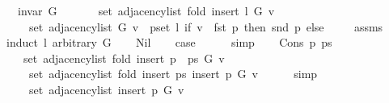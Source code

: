 \begin{isabellebody}
\ \ \ {\isachardoublequoteopen}invar\ G{\isachardoublequoteclose}\isanewline
\ \ \isanewline
\ \ \ \ {\isachardoublequoteopen}set\ {\isacharparenleft}{\kern0pt}adjacency{\isacharunderscore}{\kern0pt}list\ {\isacharparenleft}{\kern0pt}fold\ insert\ l\ G{\isacharparenright}{\kern0pt}\ v{\isacharparenright}{\kern0pt}\ {\isacharequal}{\kern0pt}\isanewline
\ \ \ \ \ set\ {\isacharparenleft}{\kern0pt}adjacency{\isacharunderscore}{\kern0pt}list\ G\ v{\isacharparenright}{\kern0pt}\ {\isasymunion}\ {\isacharparenleft}{\kern0pt}{\isasymUnion}p{\isasymin}set\ l{\isachardot}{\kern0pt}\ if\ v\ {\isacharequal}{\kern0pt}\ fst\ p\ then\ {\isacharbraceleft}{\kern0pt}snd\ p{\isacharbraceright}{\kern0pt}\ else\ {\isacharbraceleft}{\kern0pt}{\isacharbraceright}{\kern0pt}{\isacharparenright}{\kern0pt}{\isachardoublequoteclose}\isanewline
%
\isadelimproof
\ \ %
\endisadelimproof
%
\isatagproof
{}\isamarkupfalse%
\ assms\isanewline
{}\isamarkupfalse%
\ {\isacharparenleft}{\kern0pt}induct\ l\ arbitrary{\isacharcolon}{\kern0pt}\ G{\isacharparenright}{\kern0pt}\isanewline
\ \ \isamarkupfalse%
\ Nil\isanewline
\ \ \isamarkupfalse%
\ {\isacharquery}{\kern0pt}case\isanewline
\ \ \ \ \isamarkupfalse%
\ simp\isanewline
{}\isamarkupfalse%
\isanewline
\ \ \isamarkupfalse%
\ {\isacharparenleft}{\kern0pt}Cons\ p\ ps{\isacharparenright}{\kern0pt}\isanewline
\ \ \isamarkupfalse%
\isanewline
\ \ \ \ {\isachardoublequoteopen}set\ {\isacharparenleft}{\kern0pt}adjacency{\isacharunderscore}{\kern0pt}list\ {\isacharparenleft}{\kern0pt}fold\ insert\ {\isacharparenleft}{\kern0pt}p\ {\isacharhash}{\kern0pt}\ ps{\isacharparenright}{\kern0pt}\ G{\isacharparenright}{\kern0pt}\ v{\isacharparenright}{\kern0pt}\ {\isacharequal}{\kern0pt}\isanewline
\ \ \ \ \ set\ {\isacharparenleft}{\kern0pt}adjacency{\isacharunderscore}{\kern0pt}list\ {\isacharparenleft}{\kern0pt}fold\ insert\ ps\ {\isacharparenleft}{\kern0pt}insert\ p\ G{\isacharparenright}{\kern0pt}{\isacharparenright}{\kern0pt}\ v{\isacharparenright}{\kern0pt}{\isachardoublequoteclose}\isanewline
\ \ \ \ \isamarkupfalse%
\ simp\isanewline
\ \ \isamarkupfalse%
\ \isamarkupfalse%
\isanewline
\ \ \ \ {\isachardoublequoteopen}{\isachardot}{\kern0pt}{\isachardot}{\kern0pt}{\isachardot}{\kern0pt}\ {\isacharequal}{\kern0pt}\isanewline
\ \ \ \ \ set\ {\isacharparenleft}{\kern0pt}adjacency{\isacharunderscore}{\kern0pt}list\ {\isacharparenleft}{\kern0pt}insert\ p\ G{\isacharparenright}{\kern0pt}\ v{\isacharparenright}{\kern0pt}\ {\isasymunion}\isanewline

\end{isabellebody}
